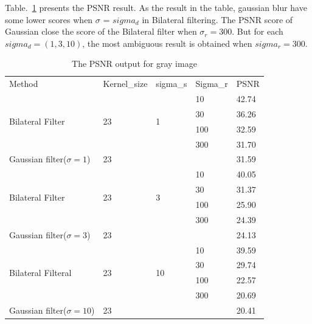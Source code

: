 \documentclass[12pt]{article}
\begin{document}
Table.~\ref{table_PSNR_gray} presents the PSNR result. 
As the result in the table, gaussian blur have some lower scores when $\sigma$ = $sigma_d$ in Bilateral filtering.
The PSNR score of Gaussian close the score of the Bilateral filter when $\sigma_r = 300$.
But for each $sigma_d = (1, 3, 10)$, the most ambiguous result is obtained when $sigma_r= 300$.


\begin{table}[H]
\centering
\begin{tabular}{lllll}
\cline{1-5}
Method & Kernel\_size & sigma\_s & Sigma\_r & PSNR  \\ \cline{1-1}
\cline{1-5}
\multirow{4}{*}{Bilateral Filter}   & \multirow{4}{*}{23} & \multirow{4}{*}{1}                               
                                  & 10      & 42.74 \\
       &             &            & 30      & 36.26     \\
       &             &            & 100     & 32.59     \\
       &             &            & 300     & 31.70     \\
\cline{1-5}
Gaussian filter($\sigma = 1$)    & 23    &      &       & 31.59    \\
\cline{1-5}
\multirow{4}{*}{Bilateral Filter}   & \multirow{4}{*}{23} & \multirow{4}{*}{3}  
                                  & 10       &40.05     \\
      &              &            & 30       & 31.37     \\
      &              &            & 100      & 25.90     \\
      &              &            & 300      & 24.39     \\
\cline{1-5}   
Gaussian filter($\sigma = 3$)    & 23    &      &     & 24.13\\    
\cline{1-5}                        
\multirow{4}{*}{Bilateral Filteral} & \multirow{4}{*}{23} & \multirow{4}{*}{10} 
                                  & 10       & 39.59     \\
     &               &            & 30       & 29.74     \\
     &               &            & 100      & 22.57     \\
     &               &            & 300      & 20.69     \\
\cline{1-5}
Gaussian filter($\sigma = 10$)    & 23    &      &       & 20.41\\
\cline{1-5}
\end{tabular}
\caption{The PSNR output for gray image}
\label{table_PSNR_gray}
\end{table}
\end{document}
